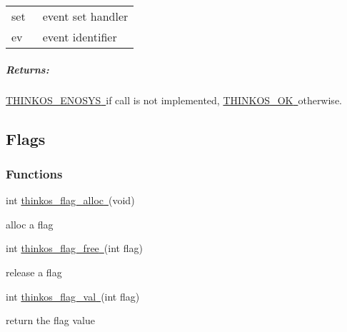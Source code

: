 {\begin{longtable}[]{@{}ll@{}}
\toprule
\begin{minipage}[t]{0.47\columnwidth}\raggedright\strut
{set}{~}\strut
\end{minipage} & \begin{minipage}[t]{0.47\columnwidth}\raggedright\strut
{event set handler }\strut
\end{minipage}\tabularnewline
\begin{minipage}[t]{0.47\columnwidth}\raggedright\strut
{ev}{~}\strut
\end{minipage} & \begin{minipage}[t]{0.47\columnwidth}\raggedright\strut
{event identifier }\strut
\end{minipage}\tabularnewline
\bottomrule
\end{longtable}

\subparagraph{\texorpdfstring{{Returns:}}{Returns:}}\label{returns-35}

{\protect\hyperlink{h.3s49zyc}{THINKOS\_ENOSYS}}{\protect\hyperlink{h.3s49zyc}{~}}{if
call is not implemented,
}{\protect\hyperlink{h.2fk6b3p}{THINKOS\_OK}}{\protect\hyperlink{h.2fk6b3p}{~}}{otherwise.
}

\paragraph{\texorpdfstring{{}}{}}\label{section-5}

\subsection{\texorpdfstring{{Flags}}{Flags}}\label{flags}

\subsubsection{\texorpdfstring{{Functions}}{Functions}}\label{h.28h4qwu}

{int
}{\protect\hyperlink{h.nmf14n}{thinkos\_flag\_alloc}}{\protect\hyperlink{h.nmf14n}{~}}{(void)}

{alloc a flag }

{int
}{\protect\hyperlink{h.37m2jsg}{thinkos\_flag\_free}}{\protect\hyperlink{h.37m2jsg}{~}}{(int
flag)}

{release a flag }

{int
}{\protect\hyperlink{h.1mrcu09}{thinkos\_flag\_val}}{\protect\hyperlink{h.1mrcu09}{~}}{(int
flag)}

{return the flag value }

}
